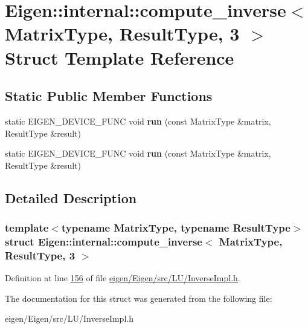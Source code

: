 \hypertarget{struct_eigen_1_1internal_1_1compute__inverse_3_01_matrix_type_00_01_result_type_00_013_01_4}{}\section{Eigen\+:\+:internal\+:\+:compute\+\_\+inverse$<$ Matrix\+Type, Result\+Type, 3 $>$ Struct Template Reference}
\label{struct_eigen_1_1internal_1_1compute__inverse_3_01_matrix_type_00_01_result_type_00_013_01_4}
\subsection*{Static Public Member Functions}
\begin{DoxyCompactItemize}
\item 
\mbox{\label{struct_eigen_1_1internal_1_1compute__inverse_3_01_matrix_type_00_01_result_type_00_013_01_4_a85ff1ae68f3676b513dc50428e8a8cf6}} 
static E\+I\+G\+E\+N\+\_\+\+D\+E\+V\+I\+C\+E\+\_\+\+F\+U\+NC void {\bfseries run} (const Matrix\+Type \&matrix, Result\+Type \&result)
\item 
\mbox{\label{struct_eigen_1_1internal_1_1compute__inverse_3_01_matrix_type_00_01_result_type_00_013_01_4_a85ff1ae68f3676b513dc50428e8a8cf6}} 
static E\+I\+G\+E\+N\+\_\+\+D\+E\+V\+I\+C\+E\+\_\+\+F\+U\+NC void {\bfseries run} (const Matrix\+Type \&matrix, Result\+Type \&result)
\end{DoxyCompactItemize}


\subsection{Detailed Description}
\subsubsection*{template$<$typename Matrix\+Type, typename Result\+Type$>$\newline
struct Eigen\+::internal\+::compute\+\_\+inverse$<$ Matrix\+Type, Result\+Type, 3 $>$}



Definition at line \hyperlink{eigen_2_eigen_2src_2_l_u_2_inverse_impl_8h_source_l00156}{156} of file \hyperlink{eigen_2_eigen_2src_2_l_u_2_inverse_impl_8h_source}{eigen/\+Eigen/src/\+L\+U/\+Inverse\+Impl.\+h}.



The documentation for this struct was generated from the following file\+:\begin{DoxyCompactItemize}
\item 
eigen/\+Eigen/src/\+L\+U/\+Inverse\+Impl.\+h\end{DoxyCompactItemize}
